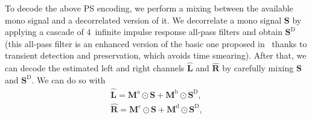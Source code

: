 \documentclass{article}
\newcommand{\ma}[1]{\textbf{#1}}
\begin{document}
To decode the above PS encoding, we perform a mixing between the available mono signal and a decorrelated version of it. We decorrelate a mono signal $\ma{S}$ by applying a cascade of 4~infinite impulse response all-pass filters and obtain $\ma{S}^{\text{D}}$ (this all-pass filter is an enhanced version of the basic one proposed in~\cite{Breebaart2005} thanks to transient detection and preservation, which avoids time smearing). After that, we can decode the estimated left and right channels $\hat{\ma{L}}$ and $\hat{\ma{R}}$ by carefully mixing $\ma{S}$ and $\ma{S}^{\text{D}}$. We can do so with
\begin{equation*}
    \begin{array}{c}
        \hat{\ma{L}} = \ma{M}^{\text{a}}\odot\ma{S} + \ma{M}^{\text{b}}\odot\ma{S}^{\text{D}} , \\
        \hat{\ma{R}} = \ma{M}^{\text{c}}\odot\ma{S} + \ma{M}^{\text{d}}\odot\ma{S}^{\text{D}} , \\
    \end{array}
\end{equation*}
\end{document}
